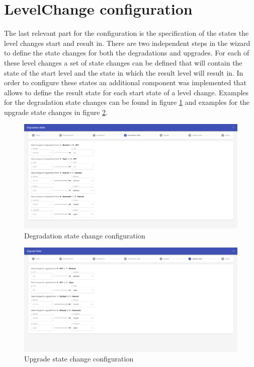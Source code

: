 \section{LevelChange configuration}
The last relevant part for the configuration is the specification of the states the level changes start and result in. There are two independent steps in the wizard to define the state changes for both the degradations and upgrades. For each of these level changes a set of state changes can be defined that will contain the state of the start level and the state in which the result level will result in. In order to configure these states an additional component was implemented that allows to define the result state for each start state of a level change. Examples for the degradation state changes can be found in figure \ref{fig:deg_state_change} and examples for the upgrade state changes in figure \ref{fig:upg:state_change}. 

\begin{figure}[ht]
    \centering
    \includegraphics[width=\textwidth]{img/degradation_level_change_states.png}
    \caption{Degradation state change configuration}
    \label{fig:deg_state_change}
\end{figure}

\begin{figure}[ht]
    \centering
    \includegraphics[width=\textwidth]{img/upgrade_level_change_states.png}
    \caption{Upgrade state change configuration}
    \label{fig:upg:state_change}
\end{figure}

